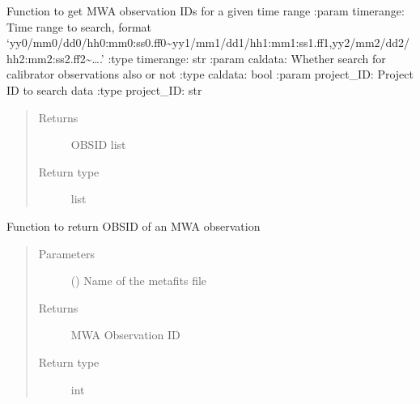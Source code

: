 \documentclass[letterpaper,10pt,english]{sphinxmanual}
\begin{document}

\begin{fulllineitems}
\label{\detokenize{paircars:paircars.basic_func.get_OBSID_for_timerange}}
\sphinxAtStartPar
Function to get MWA observation IDs for a given time range
:param timerange: Time range to search, format ‘yy0/mm0/dd0/hh0:mm0:ss0.ff0\textasciitilde{}yy1/mm1/dd1/hh1:mm1:ss1.ff1,yy2/mm2/dd2/hh2:mm2:ss2.ff2\textasciitilde{}….’
:type timerange: str
:param caldata: Whether search for calibrator observations also or not
:type caldata: bool
:param project\_ID: Project ID to search data
:type project\_ID: str
\begin{quote}\begin{description}
\item[{Returns}] \leavevmode
\sphinxAtStartPar
OBSID list

\item[{Return type}] \leavevmode
\sphinxAtStartPar
list

\end{description}\end{quote}

\end{fulllineitems}


\begin{fulllineitems}
\label{\detokenize{paircars:paircars.basic_func.get_OBSID_from_metafits}}
\sphinxAtStartPar
Function to return OBSID of an MWA observation
\begin{quote}\begin{description}
\item[{Parameters}] \leavevmode
\sphinxAtStartPar
{} () \textendash{} Name of the metafits file

\item[{Returns}] \leavevmode
\sphinxAtStartPar
MWA Observation ID

\item[{Return type}] \leavevmode
\sphinxAtStartPar
int

\end{description}\end{quote}

\end{fulllineitems}
\end{document}
